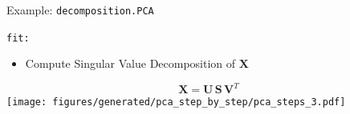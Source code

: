 \documentclass[presentation,mathserif,table]{beamer}
\newcommand{\X}{{\mathbold X}}
\newcommand{\bS}{{\mathbold S}}
\newcommand{\U}{{\mathbold U}}
\newcommand{\V}{{\mathbold V}}
\begin{document}
\begin{frame}[label={sec:org363276d},fragile]{Example: \texttt{decomposition.PCA}}
 \begin{block}{\texttt{fit:}}
\begin{itemize}
\item Compute Singular Value Decomposition of \(\X\)
\end{itemize}
\begin{structureenv} %
\begin{equation}
\X = \U \, \bS \, \V^T
\end{equation}
\texttt{[image: figures/generated/pca\_step\_by\_step/pca\_steps\_3.pdf]}
\end{structureenv}
\end{block}
\end{frame}
\end{document}
